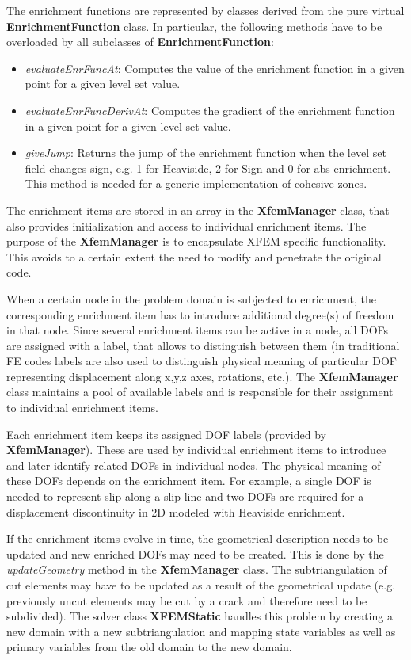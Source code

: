 \documentclass[a4paper]{article}
\newcommand{\class}[1]{{\bf #1}}
\newcommand{\service}[1]{{\em #1}}
\begin{document}
The enrichment functions are represented by classes derived from the pure
virtual \class{EnrichmentFunction} class. In particular, the following methods
have to be overloaded by all subclasses of \class{EnrichmentFunction}:
\begin{itemize}
  \item \service{evaluateEnrFuncAt}: Computes the value of the enrichment
  function in a given point for a given level set value.
  \item \service{evaluateEnrFuncDerivAt}: Computes the gradient of the enrichment
  function in a given point for a given level set value.
  \item \service{giveJump}: Returns the jump of the enrichment function when the
  level set field changes sign, e.g. 1 for Heaviside, 2 for Sign and 0 for abs
  enrichment. This method is needed for a generic implementation of cohesive
  zones.
\end{itemize}


The enrichment items are stored in an array in the \class{XfemManager}
class, that also provides initialization and access to individual
enrichment items. The purpose of the \class{XfemManager} is to encapsulate XFEM
specific functionality. This avoids to a certain extent the need to modify and
penetrate the original code.

When a certain node in the problem domain is subjected to enrichment, the
corresponding enrichment item has to introduce additional degree(s) of freedom
in that node. Since several enrichment items can be active in a node, all DOFs
are assigned with a label, that allows to distinguish between them (in
traditional FE codes labels are also used to distinguish physical meaning of
particular DOF representing displacement along x,y,z axes, rotations, etc.).
The \class{XfemManager} class maintains a pool of available labels and is
responsible for their assignment to individual enrichment items.

Each enrichment item keeps its assigned DOF labels (provided by \class{XfemManager}).
These are used by individual enrichment items to introduce and later identify
related DOFs in individual nodes. The physical meaning of these DOFs depends on
the enrichment item. For example, a single DOF is needed to represent slip along
a slip line and two DOFs are required for a displacement discontinuity in 2D
modeled with Heaviside enrichment.



If the enrichment items evolve in time, the geometrical description needs to be
updated and new enriched DOFs may need to be created. This is done by the
\service{updateGeometry} method in the \class{XfemManager} class. The
subtriangulation of cut elements may have to be updated as a result of the
geometrical update (e.g. previously uncut elements may be cut by a crack and
therefore need to be subdivided). The solver class \class{XFEMStatic} handles
this problem by creating a new domain with a new subtriangulation and mapping
state variables as well as primary variables from the old domain to the new
domain.
\end{document}
